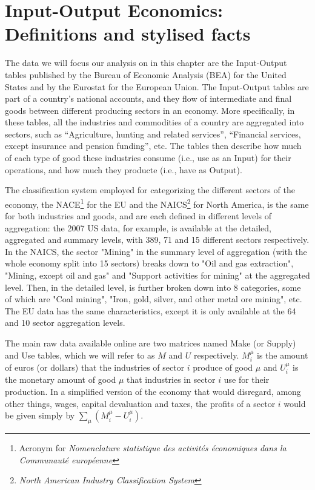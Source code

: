 \section{Input-Output Economics: Definitions and stylised facts}
\label{sec:IO}

The data we will focus our analysis on in this chapter are the Input-Output tables published by
the Bureau of Economic Analysis (BEA) for the United States and by the
Eurostat for the European Union. The Input-Output tables are part of a country's national accounts, and they flow of intermediate and final goods between different producing sectors in an economy. More specifically, in these tables, all the industries
and commodities of a country are aggregated into sectors, such as
``Agriculture, hunting and related services'', ``Financial services,
except insurance and pension funding'', etc. The tables then describe how much of each type of good these industries consume (i.e., use as an Input) for their operations, and how much they producte (i.e., have as Output). 

The classification system employed for categorizing the different sectors of the economy, the NACE\footnote{Acronym for \emph{Nomenclature statistique des activités économiques dans la Communauté européenne}} for the EU and the NAICS\footnote{\emph{North American Industry Classification System}} for North America, is the
same for both industries and goods, and are each defined in different levels of
aggregation: the 2007 US data, for example, is available at the
detailed, aggregated and summary levels, with 389, 71 and 15 different
sectors respectively. In the NAICS, the sector "Mining" in the summary level of aggregation (with the whole economy split into 15 sectors) breaks down to "Oil and gas extraction", "Mining, except oil and gas" and "Support activities for mining" at the aggregated level. Then, in the detailed level, is further broken down into 8 categories, some of which are "Coal mining", "Iron, gold, silver, and other metal ore mining", etc. The EU data has the same characteristics, except it is only available at the 64 and 10 sector aggregation levels.

The main raw data available online \cite{bea_data, eurostat_data} are two matrices named Make (or Supply) and Use tables,
which we will refer to as $M$ and $U$ respectively. $M_i^\mu$ is the
amount of euros (or dollars) that the industries of sector $i$ produce
of good $\mu$ and $U_i^\mu$ is the monetary amount of good $\mu$ that
industries in sector $i$ use for their production. In a simplified version of the
economy that would disregard, among other things, wages, capital
devaluation and taxes, the profits of a sector $i$ would be given
simply by $\sum_\mu (M_i^\mu - U_i^\mu)$.

